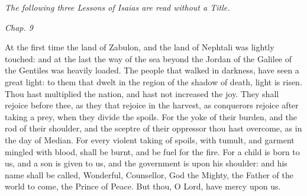 {{    \emph{The following three Lessons of Isaias are read without a Title.}
  }

  \bigskip
  {
    \hspace{10ex}{Lesson I.}\hfill\emph{Chap. 9}\hspace{10ex}

    \begin{parcolumns}[rulebetween,colwidths={1=.51\linewidth}]{2}
    {At the first time the land of Zabulon, and the land of Nephtali was lightly touched: and at the last the way of the sea beyond the Jordan of the Galilee of the Gentiles was heavily loaded.
      The people that walked in darkness, have seen a great light: to them that dwelt in the region of the shadow of death, light is risen.
      Thou hast multiplied the nation, and hast not increased the joy. They shall rejoice before thee, as they that rejoice in the harvest, as conquerors rejoice after taking a prey, when they divide the spoils.
      For the yoke of their burden, and the rod of their shoulder, and the sceptre of their oppressor thou hast overcome, as in the day of Median.
      For every violent taking of spoils, with tumult, and garment mingled with blood, shall be burnt, and be fuel for the fire.
      For a child is born to us, and a son is given to us, and the government is upon his shoulder: and his name shall be called, Wonderful, Counsellor, God the Mighty, the Father of the world to come, the Prince of Peace.
      But thou, O Lord, have mercy upon us.}
    \end{parcolumns}

  }

}
